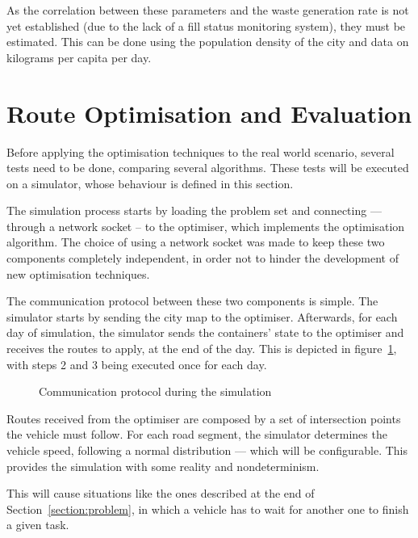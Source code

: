 As the correlation between these parameters and the waste generation rate is
not yet established (due to the lack of a fill status monitoring system), they
must be estimated. This can be done using the population density of the city
and data on kilograms per capita per day.








\section{Route Optimisation and Evaluation}
\label{section:simulation}

Before applying the optimisation techniques to the real world scenario, several
tests need to be done, comparing several algorithms. These tests will be
executed on a simulator, whose behaviour is defined in this section.

The simulation process starts by loading the problem set and connecting ---
through a network socket -- to the optimiser, which implements the optimisation
algorithm. The choice of using a network socket was made to keep these two
components completely independent, in order not to hinder the development of
new optimisation techniques.

The communication protocol between these two components is simple. The
simulator starts by sending the city map to the optimiser. Afterwards, for each
day of simulation, the simulator sends the containers' state to the optimiser
and receives the routes to apply, at the end of the day. This is depicted in
figure~\ref{fig:protocol}, with steps 2 and 3 being executed once for each day.

\begin{figure}[th]
\centering

\caption{Communication protocol during the simulation}
\label{fig:protocol}
\end{figure}

Routes received from the optimiser are composed by a set of intersection
points the vehicle must follow. For each road segment, the simulator
determines the vehicle speed, following a normal distribution --- which will
be configurable. This provides the simulation with some reality and
nondeterminism. 

This will cause situations like the ones described at the end of
Section~\ref{section:problem}, in which a vehicle has to wait for another one
to finish a given task.

